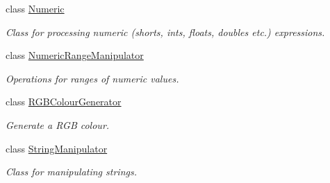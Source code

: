 \begin{DoxyCompactItemize}
class \hyperlink{classmultiscale_1_1Numeric}{\-Numeric}
\begin{DoxyCompactList}\small\item\em \-Class for processing numeric (shorts, ints, floats, doubles etc.) expressions. \end{DoxyCompactList}\item 
class \hyperlink{classmultiscale_1_1NumericRangeManipulator}{\-Numeric\-Range\-Manipulator}
\begin{DoxyCompactList}\small\item\em \-Operations for ranges of numeric values. \end{DoxyCompactList}\item 
class \hyperlink{classmultiscale_1_1RGBColourGenerator}{\-R\-G\-B\-Colour\-Generator}
\begin{DoxyCompactList}\small\item\em \-Generate a \-R\-G\-B colour. \end{DoxyCompactList}\item 
class \hyperlink{classmultiscale_1_1StringManipulator}{\-String\-Manipulator}
\begin{DoxyCompactList}\small\item\em \-Class for manipulating strings. \end{DoxyCompactList}\end{DoxyCompactItemize}
